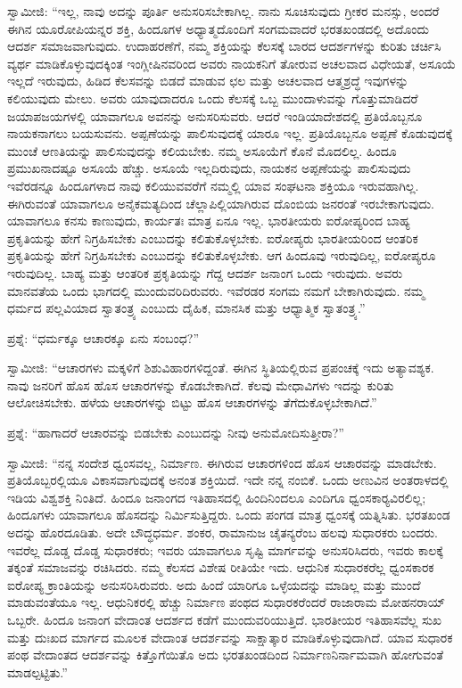  ಸ್ವಾಮೀಜಿ: “ಇಲ್ಲ, ನಾವು ಅದನ್ನು ಪೂರ್ತಿ ಅನುಸರಿಸಬೇಕಾಗಿಲ್ಲ. ನಾನು ಸೂಚಿಸುವುದು ಗ್ರೀಕರ ಮನಸ್ಸು, ಅಂದರೆ ಈಗಿನ ಯೂರೋಪಿಯನ್ನರ ಶಕ್ತಿ, ಹಿಂದೂಗಳ ಅಧ್ಯಾತ್ಮದೊಂದಿಗೆ ಸಂಗಮವಾದರೆ ಭರತಖಂಡದಲ್ಲಿ ಅದೊಂದು ಆದರ್ಶ ಸಮಾಜವಾಗುವುದು. ಉದಾಹರಣೆಗೆ, ನಮ್ಮ ಶಕ್ತಿಯನ್ನು ಕೆಲಸಕ್ಕೆ ಬಾರದ ಆದರ್ಶಗಳನ್ನು ಕುರಿತು ಚರ್ಚಿಸಿ ವ್ಯರ್ಥ ಮಾಡಿಕೊಳ್ಳುವುದಕ್ಕಿಂತ ಇಂಗ್ಲೀಷಿನವರಿಂದ ಅವರು ನಾಯಕನಿಗೆ ತೋರುವ ಅಚಲವಾದ ವಿಧೇಯತೆ, ಅಸೂಯೆ ಇಲ್ಲದೆ ಇರುವುದು, ಹಿಡಿದ ಕೆಲಸವನ್ನು ಬಿಡದೆ ಮಾಡುವ ಛಲ ಮತ್ತು ಅಚಲವಾದ ಆತ್ಮಶ್ರದ್ಧೆ ಇವುಗಳನ್ನು ಕಲಿಯುವುದು ಮೇಲು. ಅವರು ಯಾವುದಾದರೂ ಒಂದು ಕೆಲಸಕ್ಕೆ ಒಬ್ಬ ಮುಂದಾಳುವನ್ನು ಗೊತ್ತುಮಾಡಿದರೆ ಜಯಾಪಜಯಗಳಲ್ಲಿ ಯಾವಾಗಲೂ ಅವನನ್ನು ಅನುಸರಿಸುವರು. ಆದರೆ ಇಂಡಿಯಾದೇಶದಲ್ಲಿ ಪ್ರತಿಯೊಬ್ಬನೂ ನಾಯಕನಾಗಲು ಬಯಸುವನು. ಅಪ್ಪಣೆಯನ್ನು ಪಾಲಿಸುವುದಕ್ಕೆ ಯಾರೂ ಇಲ್ಲ. ಪ್ರತಿಯೊಬ್ಬನೂ ಅಪ್ಪಣೆ ಕೊಡುವುದಕ್ಕೆ ಮುಂಚೆ ಆಣತಿಯನ್ನು ಪಾಲಿಸುವುದನ್ನು ಕಲಿಯಬೇಕು. ನಮ್ಮ ಅಸೂಯೆಗೆ ಕೊನೆ ಮೊದಲಿಲ್ಲ. ಹಿಂದೂ ಪ್ರಮುಖನಾದಷ್ಟೂ ಅಸೂಯೆ ಹೆಚ್ಚು. ಅಸೂಯೆ ಇಲ್ಲದಿರುವುದು, ನಾಯಕನ ಅಪ್ಪಣೆಯನ್ನು ಪಾಲಿಸುವುದು ಇವೆರಡನ್ನೂ ಹಿಂದೂಗಳಾದ ನಾವು ಕಲಿಯುವವರೆಗೆ ನಮ್ಮಲ್ಲಿ ಯಾವ ಸಂಘಟನಾ ಶಕ್ತಿಯೂ ಇರುವಹಾಗಿಲ್ಲ. ಈಗಿರುವಂತೆ ಯಾವಾಗಲೂ ಅನೈಕಮತ್ಯದಿಂದ ಚೆಲ್ಲಾಪಿಲ್ಲಿಯಾಗಿರುವ ದೊಂಬಿಯ ಜನರಂತೆ ಇರಬೇಕಾಗುವುದು. ಯಾವಾಗಲೂ ಕನಸು ಕಾಣುವುದು, ಕಾರ್ಯತಃ ಮಾತ್ರ ಏನೂ ಇಲ್ಲ. ಭಾರತೀಯರು ಐರೋಪ್ಯರಿಂದ ಬಾಹ್ಯ ಪ್ರಕೃತಿಯನ್ನು ಹೇಗೆ ನಿಗ್ರಹಿಸಬೇಕು ಎಂಬುದನ್ನು ಕಲಿತುಕೊಳ್ಳಬೇಕು. ಐರೋಪ್ಯರು ಭಾರತೀಯರಿಂದ ಆಂತರಿಕ ಪ್ರಕೃತಿಯನ್ನು ಹೇಗೆ ನಿಗ್ರಹಿಸಬೇಕು ಎಂಬುದನ್ನು ಕಲಿತುಕೊಳ್ಳಬೇಕು. ಆಗ ಹಿಂದೂವು ಇರುವುದಿಲ್ಲ, ಐರೋಪ್ಯರೂ ಇರುವುದಿಲ್ಲ. ಬಾಹ್ಯ ಮತ್ತು ಆಂತರಿಕ ಪ್ರಕೃತಿಯನ್ನು ಗೆದ್ದ ಆದರ್ಶ ಜನಾಂಗ ಒಂದು ಇರುವುದು. ಅವರು ಮಾನವತೆಯ ಒಂದು ಭಾಗದಲ್ಲಿ ಮುಂದುವರಿದಿರುವರು. ಇವೆರಡರ ಸಂಗಮ ನಮಗೆ ಬೇಕಾಗಿರುವುದು. ನಮ್ಮ ಧರ್ಮದ ಪಲ್ಲವಿಯಾದ ಸ್ವಾತಂತ್ರ್ಯ ಎಂಬುದು ದೈಹಿಕ, ಮಾನಸಿಕ ಮತ್ತು ಆಧ್ಯಾತ್ಮಿಕ ಸ್ವಾತಂತ್ರ್ಯ.” 

 ಪ್ರಶ್ನೆ: “ಧರ್ಮಕ್ಕೂ ಆಚಾರಕ್ಕೂ ಏನು ಸಂಬಂಧ?” 

 ಸ್ವಾಮೀಜಿ: “ಆಚಾರಗಳು ಮಕ್ಕಳಿಗೆ ಶಿಶುವಿಹಾರಗಳಿದ್ದಂತೆ. ಈಗಿನ ಸ್ಥಿತಿಯಲ್ಲಿರುವ ಪ್ರಪಂಚಕ್ಕೆ ಇದು ಅತ್ಯಾವಶ್ಯಕ. ನಾವು ಜನರಿಗೆ ಹೊಸ ಹೊಸ ಆಚಾರಗಳನ್ನು ಕೊಡಬೇಕಾಗಿದೆ. ಕೆಲವು ಮೇಧಾವಿಗಳು ಇದನ್ನು ಕುರಿತು ಆಲೋಚಿಸಬೇಕು. ಹಳೆಯ ಆಚಾರಗಳನ್ನು ಬಿಟ್ಟು ಹೊಸ ಆಚಾರಗಳನ್ನು ತೆಗೆದುಕೊಳ್ಳಬೇಕಾಗಿದೆ.” 

 ಪ್ರಶ್ನೆ: “ಹಾಗಾದರೆ ಆಚಾರವನ್ನು ಬಿಡಬೇಕು ಎಂಬುದನ್ನು ನೀವು ಅನುಮೋದಿಸುತ್ತೀರಾ?” 

 ಸ್ವಾಮೀಜಿ: “ನನ್ನ ಸಂದೇಶ ಧ್ವಂಸವಲ್ಲ, ನಿರ್ಮಾಣ. ಈಗಿರುವ ಆಚಾರಗಳಿಂದ ಹೊಸ ಆಚಾರವನ್ನು ಮಾಡಬೇಕು. ಪ್ರತಿಯೊಬ್ಬರಲ್ಲಿಯೂ ವಿಕಾಸವಾಗುವುದಕ್ಕೆ ಅನಂತ ಶಕ್ತಿಯಿದೆ. ಇದೇ ನನ್ನ ನಂಬಿಕೆ. ಒಂದು ಅಣುವಿನ ಅಂತರಾಳದಲ್ಲಿ ಇಡಿಯ ವಿಶ್ವಶಕ್ತಿ ನಿಂತಿದೆ. ಹಿಂದೂ ಜನಾಂಗದ ಇತಿಹಾಸದಲ್ಲಿ ಹಿಂದಿನಿಂದಲೂ ಎಂದಿಗೂ ಧ್ವಂಸಕಾರ‍್ಯವಿರಲಿಲ್ಲ; ಹಿಂದೂಗಳು ಯಾವಾಗಲೂ ಹೊಸದನ್ನು ನಿರ್ಮಿಸುತ್ತಿದ್ದರು. ಒಂದು ಪಂಗಡ ಮಾತ್ರ ಧ್ವಂಸಕ್ಕೆ ಯತ್ನಿಸಿತು. ಭರತಖಂಡ ಅದನ್ನು ಹೊರದೂಡಿತು. ಅದೇ ಬೌದ್ಧಧರ್ಮ. ಶಂಕರ, ರಾಮಾನುಜ ಚೈತನ್ಯರೆಂಬ ಹಲವು ಸುಧಾರಕರು ಬಂದರು. ಇವರೆಲ್ಲ ದೊಡ್ಡ ದೊಡ್ಡ ಸುಧಾರಕರು; ಇವರು ಯಾವಾಗಲೂ ಸೃಷ್ಟಿ ಮಾರ್ಗವನ್ನು ಅನುಸರಿಸಿದರು, ಇವರು ಕಾಲಕ್ಕೆ ತಕ್ಕಂತೆ ಸಮಾಜವನ್ನು ರಚಿಸಿದರು. ನಮ್ಮ ಕೆಲಸದ ವಿಶೇಷ ರೀತಿಯೇ ಇದು. ಆಧುನಿಕ ಸುಧಾರಕರೆಲ್ಲ ಧ್ವಂಸಕಾರಕ ಐರೋಪ್ಯ ಕ್ರಾಂತಿಯನ್ನು ಅನುಸರಿಸಿರುವರು. ಅದು ಹಿಂದೆ ಯಾರಿಗೂ ಒಳ್ಳೆಯದನ್ನು ಮಾಡಿಲ್ಲ ಮತ್ತು ಮುಂದೆ ಮಾಡುವಂತೆಯೂ ಇಲ್ಲ. ಆಧುನಿಕರಲ್ಲಿ ಹೆಚ್ಚು ನಿರ್ಮಾಣ ಪಂಥದ ಸುಧಾರಕರೆಂದರೆ ರಾಜಾರಾಮ ಮೋಹನರಾಯ್ ಒಬ್ಬರೇ. ಹಿಂದೂ ಜನಾಂಗ ವೇದಾಂತ ಆದರ್ಶದ ಕಡೆಗೆ ಮುಂದುವರಿಯುತ್ತಿದೆ. ಭಾರತೀಯರ ಇತಿಹಾಸವೆಲ್ಲ ಸುಖ ಮತ್ತು ದುಃಖದ ಮಾರ್ಗದ ಮೂಲಕ ವೇದಾಂತ ಆದರ್ಶವನ್ನು ಸಾಕ್ಷಾತ್ಕಾರ ಮಾಡಿಕೊಳ್ಳುವುದಾಗಿದೆ. ಯಾವ ಸುಧಾರಕ ಪಂಥ ವೇದಾಂತದ ಆದರ್ಶವನ್ನು ಕಿತ್ತೊಗೆಯಿತೊ ಅದು ಭರತಖಂಡದಿಂದ ನಿರ್ಮಾಣನಿರ್ನಾಮವಾಗಿ ಹೋಗುವಂತೆ ಮಾಡಲ್ಪಟ್ಟಿತು.” 

